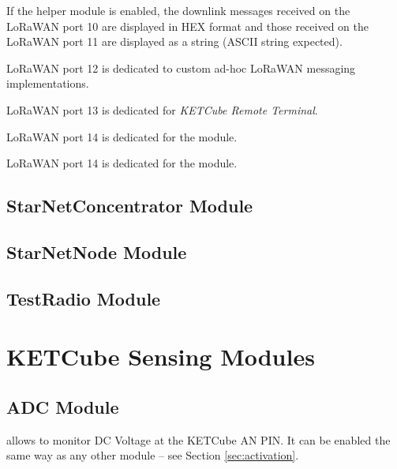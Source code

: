   If the helper module  is enabled, the downlink messages received on the LoRaWAN port 10 are displayed in HEX format and those received on the LoRaWAN port 11 are displayed as a string (ASCII string expected).
  
  LoRaWAN port 12 is dedicated to custom ad-hoc LoRaWAN messaging implementations.
  
  LoRaWAN port 13 is dedicated for {\it KETCube Remote Terminal}.
  
  LoRaWAN port 14 is dedicated for the  module.
  
  LoRaWAN port 14 is dedicated for the  module.

\clearpage
\subsection{StarNetConcentrator Module}


\clearpage
\subsection{StarNetNode Module}


\clearpage
\subsection{TestRadio Module}




\clearpage
\section{KETCube Sensing Modules}

\subsection{ADC Module}
 allows to monitor DC Voltage at the KETCube AN PIN. It can be enabled the same way as any other module -- see Section \ref{sec:activation}.

